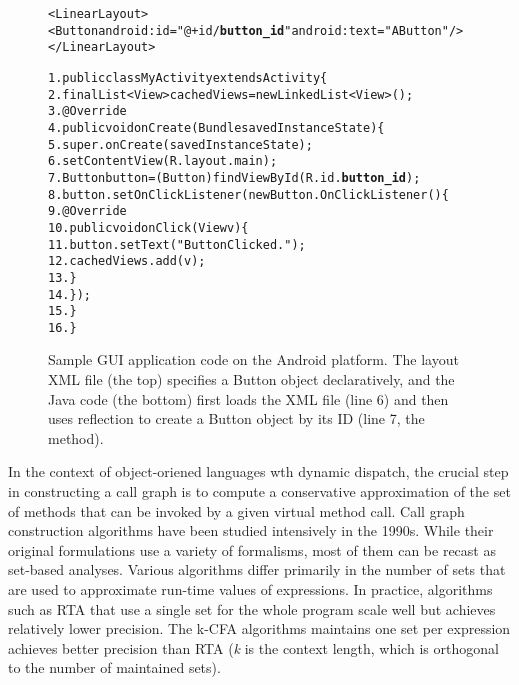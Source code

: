 \begin{figure}[t]
\begin{CodeOut}
\begin{alltt}

<LinearLayout>
    <Button android:id="@+id/\textbf{button\_id}" android:text="A Button" />
</LinearLayout>

1. public class MyActivity extends Activity \{
2.    final List<View> cachedViews = new LinkedList<View>();
3.    @Override
4.    public void onCreate(Bundle savedInstanceState) \{
5.        super.onCreate(savedInstanceState);
6.        setContentView(R.layout.main);
7.        Button button = (Button) findViewById(R.id.\textbf{button\_id});
8.        button.setOnClickListener(new Button.OnClickListener() \{
9.            @Override
10.           public void onClick(View v) \{
11.               button.setText("Button Clicked.");
12.               cachedViews.add(v);
13.           \}
14.       \});
15.   \}
16. \}
\end{alltt}
\end{CodeOut}
\label{fig:sampleandroid}
\caption{Sample GUI application code on the Android platform. The layout
XML file (the top) specifies a Button object declaratively, 
and the Java code (the bottom)
first loads the XML file (line 6) and then uses reflection to create
a Button object by its ID (line 7, the  method).}
\end{figure}

In the context of object-oriened languages wth dynamic dispatch, the
crucial step in constructing a call graph is to compute a conservative
approximation of the set of methods that can be invoked by a given
virtual method call. Call graph construction algorithms have been
studied intensively in the 1990s. While their original formulations
use a variety of formalisms, most of them can be recast as set-based
analyses. Various algorithms differ primarily in the number of sets
that are used to approximate run-time values of expressions. 
In practice, algorithms such as RTA that use a single set for the whole
program scale well but achieves relatively lower precision. The
k-CFA algorithms maintains one set per expression achieves better
precision than RTA (\textit{k} is the context length, which is
orthogonal to the number of maintained sets).


